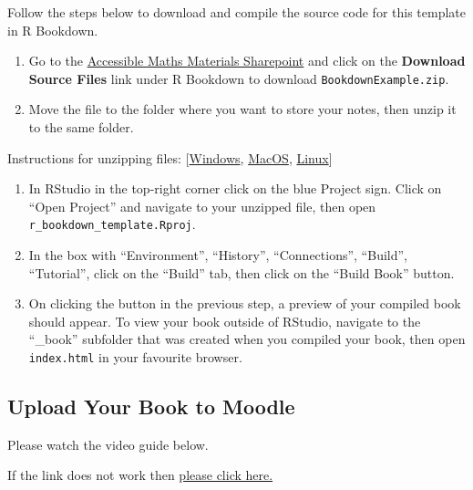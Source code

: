 \documentclass[
]{article}
\providecommand{\tightlist}{%
  \setlength{\itemsep}{0pt}\setlength{\parskip}{0pt}}
\numberwithin{equation}{section}
\numberwithin{figure}{section}
\theoremstyle{break}
\theoremstyle{definition}
\theoremstyle{definition}
\theoremstyle{definition}
\theoremstyle{definition}
\theoremstyle{remark}
\begin{document}
Follow the steps below to download and compile the source code for this template in R Bookdown.

\begin{enumerate}
\def\labelenumi{\arabic{enumi})}
\tightlist
\item
  Go to the \href{https://uniofnottm.sharepoint.com/sites/AccessibleMathsMaterials?target=_blank}{Accessible Maths Materials Sharepoint} and click on the \textbf{Download Source Files} link under R Bookdown to download \texttt{BookdownExample.zip}.
\item
  Move the file to the folder where you want to store your notes, then unzip it to the same folder.
\end{enumerate}

Instructions for unzipping files: {[}\href{https://support.microsoft.com/en-us/windows/zip-and-unzip-files-f6dde0a7-0fec-8294-e1d3-703ed85e7ebc?target=_blank}{Windows}, \href{https://support.apple.com/en-gb/guide/mac-help/mchlp2528/mac\#:~:text=Unzip\%20(expand)\%20a\%20compressed\%20item,zip\%20file.?target=_blank}{MacOS}, \href{https://unstop.com/blog/how-to-unzip-a-file-in-linux?target=_blank}{Linux}{]}

\begin{enumerate}
\def\labelenumi{\arabic{enumi})}
\setcounter{enumi}{2}
\item
  In RStudio in the top-right corner click on the blue Project sign. Click on ``Open Project'' and navigate to your unzipped file, then open \texttt{r\_bookdown\_template.Rproj}.
\item
  In the box with ``Environment'', ``History'', ``Connections'', ``Build'', ``Tutorial'', click on the ``Build'' tab, then click on the ``Build Book'' button.
\item
  On clicking the button in the previous step, a preview of your compiled book should appear. To view your book outside of RStudio, navigate to the ``\_book'' subfolder that was created when you compiled your book, then open \texttt{index.html} in your favourite browser.
\end{enumerate}

\hypertarget{upload-your-book-to-moodle}{%
\subsection{Upload Your Book to Moodle}\label{upload-your-book-to-moodle}}

Please watch the video guide below.

If the link does not work then \href{https://mediaspace.nottingham.ac.uk/media/How+to+upload+R+bookdown+file+to+Moodle/1_la5eitil}{please click here.}
\end{document}
